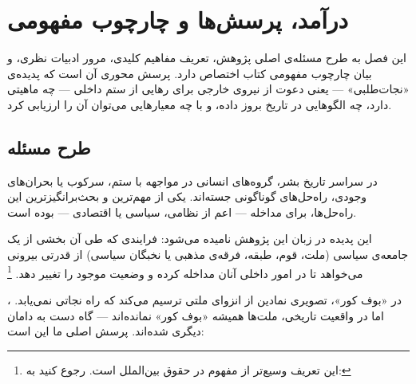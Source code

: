 \chapter{درآمد، پرسش‌ها و چارچوب مفهومی}

\label{ch:introduction}

\begin{tcolorbox}[mybox, title={چکیده‌ی فصل}]
این فصل به طرح مسئله‌ی اصلی پژوهش، تعریف مفاهیم کلیدی، مرور ادبیات نظری، و بیان چارچوب مفهومی کتاب اختصاص دارد. پرسش محوری آن است که پدیده‌ی «نجات‌طلبی» — یعنی دعوت از نیروی خارجی برای رهایی از ستم داخلی — چه ماهیتی دارد، چه الگوهایی در تاریخ بروز داده، و با چه معیارهایی می‌توان آن را ارزیابی کرد.
\end{tcolorbox}

\section{طرح مسئله}
\label{sec:ch01-problem}

در سراسر تاریخ بشر، گروه‌های انسانی در مواجهه با ستم، سرکوب یا بحران‌های وجودی، راه‌حل‌های گوناگونی جسته‌اند. یکی از مهم‌ترین و بحث‌برانگیزترین این راه‌حل‌ها،  برای مداخله — اعم از نظامی، سیاسی یا اقتصادی — بوده است.

این پدیده در زبان این پژوهش  نامیده می‌شود: فرایندی که طی آن بخشی از یک جامعه‌ی سیاسی (ملت، قوم، طبقه، فرقه‌ی مذهبی یا نخبگان سیاسی) از قدرتی بیرونی می‌خواهد تا در امور داخلی آنان مداخله کرده و وضعیت موجود را تغییر دهد.%
\footnote{این تعریف وسیع‌تر از مفهوم  در حقوق بین‌الملل است. رجوع کنید به: }

، در «بوف کور»، تصویری نمادین از انزوای ملتی ترسیم می‌کند که راه نجاتی نمی‌یابد. اما در واقعیت تاریخی، ملت‌ها همیشه «بوف کور» نمانده‌اند — گاه دست به دامان دیگری شده‌اند. پرسش اصلی ما این است:

